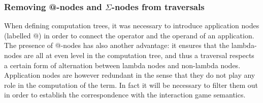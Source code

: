 \subsubsection{Removing @-nodes and \texorpdfstring{$\Sigma$}{constant}-nodes from traversals}
\label{subsec:tstar}

When defining computation trees, it was necessary to introduce
application nodes (labelled @) in order to connect the operator and
the operand of an application. The presence of @-nodes has also
another advantage: it ensures that the lambda-nodes are all at even
level in the computation tree, and thus a traversal respects a
certain form of alternation between lambda nodes and non-lambda
nodes. Application nodes are however redundant in the sense that
they do not play any role in the computation of the term. In fact it
will be necessary to filter them out in order to establish the
correspondence with the interaction game semantics.

